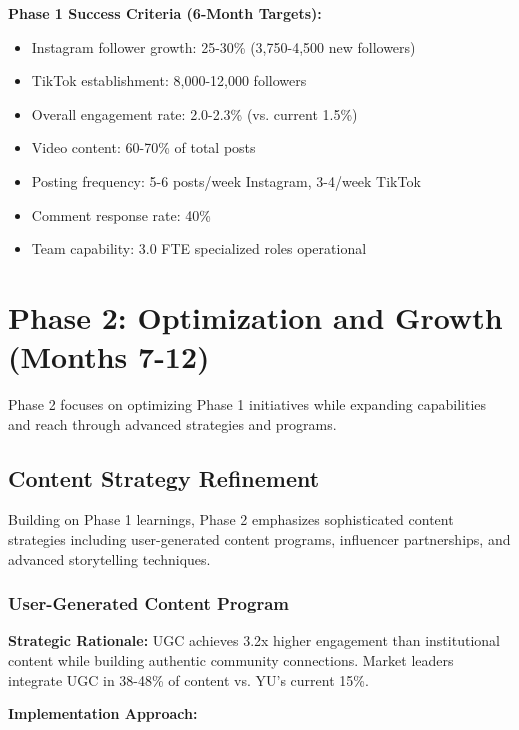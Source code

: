 \documentclass[12pt]{report}
\begin{document}
\textbf{Phase 1 Success Criteria (6-Month Targets):}

\begin{itemize}
\item Instagram follower growth: 25-30\% (3,750-4,500 new followers)
\item TikTok establishment: 8,000-12,000 followers
\item Overall engagement rate: 2.0-2.3\% (vs. current 1.5\%)
\item Video content: 60-70\% of total posts
\item Posting frequency: 5-6 posts/week Instagram, 3-4/week TikTok
\item Comment response rate: 40\%
\item Team capability: 3.0 FTE specialized roles operational
\end{itemize}

\chapter{Phase 2: Optimization and Growth (Months 7-12)}

Phase 2 focuses on optimizing Phase 1 initiatives while expanding capabilities and reach through advanced strategies and programs.

\section{Content Strategy Refinement}

Building on Phase 1 learnings, Phase 2 emphasizes sophisticated content strategies including user-generated content programs, influencer partnerships, and advanced storytelling techniques.

\subsection{User-Generated Content Program}

\textbf{Strategic Rationale:} UGC achieves 3.2x higher engagement than institutional content while building authentic community connections. Market leaders integrate UGC in 38-48\% of content vs. YU's current 15\%.

\textbf{Implementation Approach:}
\end{document}
